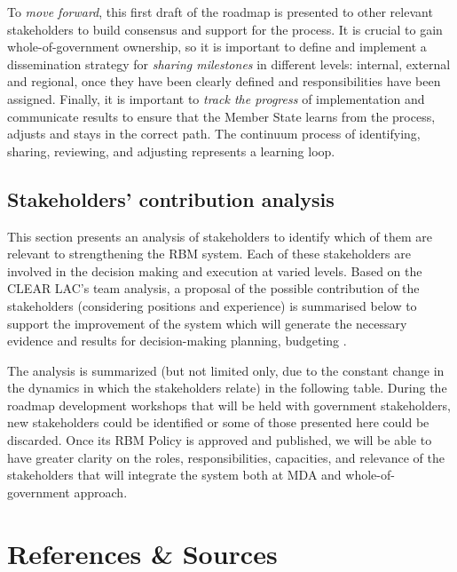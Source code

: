 \documentclass[
]{book}
\begin{document}
To \emph{move forward}, this first draft of the roadmap is presented to other relevant stakeholders to build consensus and support for the process. It is crucial to gain whole-of-government ownership, so it is important to define and implement a dissemination strategy for \emph{sharing milestones} in different levels: internal, external and regional, once they have been clearly defined and responsibilities have been assigned. Finally, it is important to \emph{track the progress} of implementation and communicate results to ensure that the Member State learns from the process, adjusts and stays in the correct path. The continuum process of identifying, sharing, reviewing, and adjusting represents a learning loop.

\hypertarget{stakeholders-contribution-analysis}{%
\section{Stakeholders' contribution analysis}\label{stakeholders-contribution-analysis}}

This section presents an analysis of stakeholders to identify which of them are relevant to strengthening the RBM system. Each of these stakeholders are involved in the decision making and execution at varied levels. Based on the CLEAR LAC's team analysis, a proposal of the possible contribution of the stakeholders (considering positions and experience) is summarised below to support the improvement of the system which will generate the necessary evidence and results for decision-making planning, budgeting .

The analysis is summarized (but not limited only, due to the constant change in the dynamics in which the stakeholders relate) in the following table. During the roadmap development workshops that will be held with government stakeholders, new stakeholders could be identified or some of those presented here could be discarded. Once its RBM Policy is approved and published, we will be able to have greater clarity on the roles, responsibilities, capacities, and relevance of the stakeholders that will integrate the system both at MDA and whole-of-government approach.

\hypertarget{references-sources}{%
\chapter*{References \& Sources}\label{references-sources}}
\end{document}
